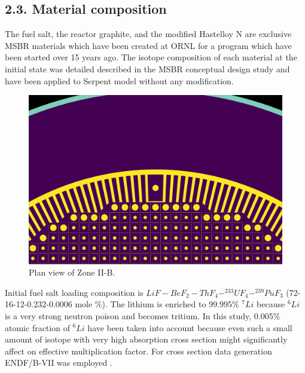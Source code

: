 \documentclass{anstrans}
\begin{document}
\subsection{2.3. Material composition}
The fuel salt, the reactor graphite, and the modified Hastelloy N are exclusive MSBR materials which have been created at ORNL for a program which have been started over 15 years ago. The isotope composition of each material at the initial state was detailed described in the MSBR conceptual design study \cite{robertson_conceptual_1971} and have been applied to Serpent model without any modification. 

\begin{figure}[hb] %
  \centering
  \includegraphics[width=0.93\linewidth]{figure_2_5.png}
  \caption{Plan view of Zone II-B.}
  \label{fig:zone2B}
\end{figure}

Initial fuel salt loading composition is $LiF-BeF_2-ThF_4-^{233}UF_4-^{239}PuF_3$ (72-16-12-0.232-0.0006 mole \%). The lithium is enriched to 99.995\% $^{7}Li$ because $^{6}Li$ is a very strong neutron poison and becomes tritium. In this study, 0.005\% atomic fraction of $^{6}Li$ have been taken into account because even such a small amount of isotope with very high absorption cross section might significantly affect on effective multiplication factor. For cross section data generation ENDF/B-VII was employed \cite{chadwick_endf/b-vii.0:_2006}. %

\end{document}
